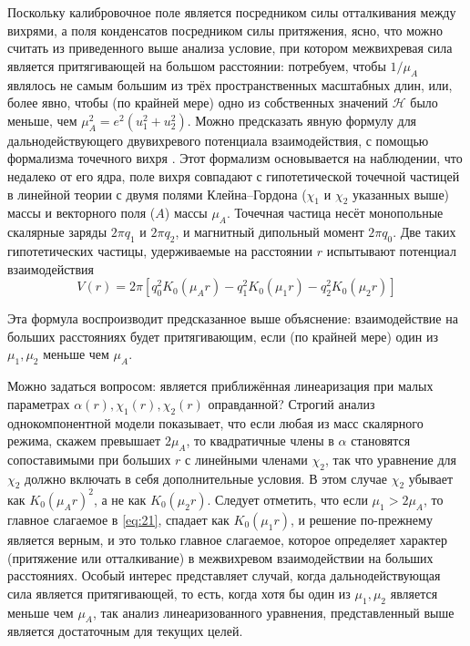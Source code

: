 Поскольку калибровочное поле является посредником силы отталкивания между 
вихрями, а поля конденсатов посредником силы притяжения, ясно, что можно 
считать из приведенного выше анализа условие, при котором межвихревая сила 
является притягивающей на большом расстоянии: потребуем, чтобы \( 1/\mu_A \) 
являлось не самым большим из трёх пространственных масштабных длин, или, 
более явно, чтобы (по крайней мере) одно из собственных значений 
\( \mathcal{H} \) было меньше, чем \( \mu_A^2 = e^2(u_1^2 + u_2^2) \). 
Можно предсказать явную формулу для дальнодействующего двувихревого 
потенциала взаимодействия, с помощью формализма точечного вихря \cite{bib:19}. 
Этот формализм основывается на наблюдении, что недалеко от его ядра, поле 
вихря совпадают с гипотетической точечной частицей в линейной теории с двумя 
полями Клейна--Гордона (\( \chi_1 \) и \( \chi_2 \) указанных выше) массы и 
векторного поля (\( A \)) массы \( \mu_A \). Точечная частица несёт 
монопольные скалярные заряды \( 2\pi q_1 \) и \( 2\pi q_2 \), и магнитный 
дипольный момент \( 2\pi q_0 \). Две таких гипотетических частицы, 
удерживаемые на расстоянии \( r \) испытывают потенциал взаимодействия
\begin{equation}
    V(r) = 2\pi\left[ q_0^2 K_0(\mu_A r) - q_1^2 K_0(\mu_1 r) - 
        q_2^2 K_0(\mu_2 r) \right]
    \label{eq:22}
\end{equation}

Эта формула воспроизводит предсказанное выше объяснение: взаимодействие на 
больших расстояниях будет притягивающим, если (по крайней мере) один из 
\( \mu_1, \mu_2 \) меньше чем \( \mu_A \). 

Можно задаться вопросом: является приближённая линеаризация при малых 
параметрах \( \alpha(r), \chi_1(r), \chi_2(r) \) оправданной? Строгий анализ 
однокомпонентной модели \cite{bib:20} показывает, что если любая из масс 
скалярного режима, скажем превышает \( 2\mu_A \), то квадратичные члены в 
\( \alpha \) становятся сопоставимыми при больших \( r \) с линейными членами 
\( \chi_2 \), так что уравнение для \( \chi_2 \) должно включать в себя 
дополнительные условия. В этом случае \( \chi_2 \) убывает как 
\( K_0(\mu_A r)^2 \), а не как \( K_0(\mu_2 r) \). Следует отметить, что если 
\( \mu_1 > 2\mu_A \), то главное слагаемое в \eqref{eq:21}, спадает как 
\( K_0(\mu_1 r) \), и решение по-прежнему является верным, и это только 
главное слагаемое, которое определяет характер (притяжение или отталкивание) в 
межвихревом взаимодействии на больших расстояниях. Особый интерес представляет 
случай, когда дальнодействующая сила является притягивающей, то есть, когда 
хотя бы один из \( \mu_1, \mu_2 \) является меньше чем \( \mu_A \), так 
анализ линеаризованного уравнения, представленный выше является достаточным 
для текущих целей. \cite{bib:main}

